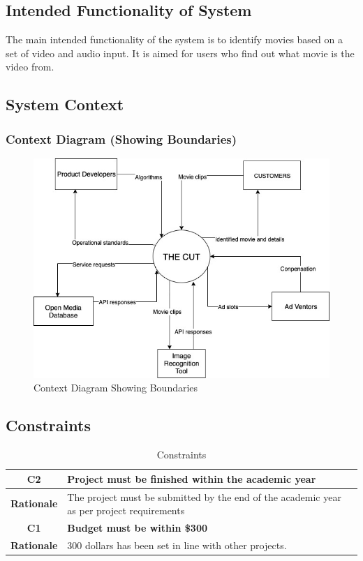 \documentclass[titlepage]{article}
\begin{document}
\subsection{Intended Functionality of System}
The main intended functionality of the system is to identify movies based on a set of video and audio input. It is aimed for users who find out what movie is the video from.

\subsection{System Context}

\subsubsection{Context Diagram (Showing Boundaries)}
\begin{figure}[H]
    \centering
    \includegraphics[width = 15cm]{img/SystemRequirement/contextDiagram.jpg}
    \caption{Context Diagram Showing Boundaries}
    \label{fig:Context}
\end{figure}

\subsection{Constraints}
\begin{table}[H]
    \centering
    \begin{tabular}{|c|l|}
        \hline
        \textbf{C2} & \textbf{Project must be finished within the academic year} \\
        \hline
        \textbf{Rationale} & The project must be submitted by the end of the academic year as per project requirements \\
        \hline
        \textbf{C1} & \textbf{Budget must be within \$300}\\
        \hline
        \textbf{Rationale} & 300 dollars has been set in line with other projects.\\
        \hline
    \end{tabular}
    \caption{Constraints}
    \label{tab:Constaints}
\end{table}
\end{document}
